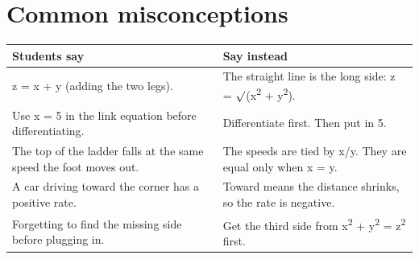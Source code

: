 \documentclass[11pt]{article}
\begin{document}
\section*{Common misconceptions}\begin{tabularx}{\textwidth}{@{}X X@{}}\toprule Students say & Say instead\\\midrule
z = x + y (adding the two legs). & The straight line is the long side: z = $\surd$(x\textsuperscript{2} + y\textsuperscript{2}).\\
Use x = 5 in the link equation before differentiating. & Differentiate first. Then put in 5.\\
The top of the ladder falls at the same speed the foot moves out. & The speeds are tied by x/y. They are equal only when x = y.\\
A car driving toward the corner has a positive rate. & Toward means the distance shrinks, so the rate is negative.\\
Forgetting to find the missing side before plugging in. & Get the third side from x\textsuperscript{2} + y\textsuperscript{2} = z\textsuperscript{2} first.\\
\bottomrule\end{tabularx}
\end{document}
